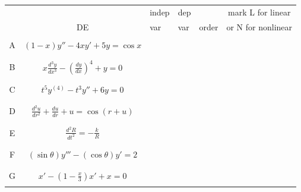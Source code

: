\documentclass[12pt]{article}
\newcommand{\<}{\langle}
\renewcommand{\>}{\rangle}
\def\ds{\displaystyle}
\begin{document}
		\begin{center}
		\begin{tabular}{|c|c|p{1.25cm}|p{1.25cm}|p{1.5cm}|c|}
		\hline
			&		& indep	& dep	&		& mark L for linear\\
			& DE		& var		& var		& order	& or N for nonlinear\\
		\hline \hline
			&		&		&		&		&\\
		A	& $\ds (1 - x)y'' - 4xy' + 5y = \cos x$
					&		&		&		&\\
			&		&		&		&		&\\
		\hline
			&		&		&		&		&\\
		B	& $\ds x \frac{d^3y}{dx^3} - \left( \frac{dy}{dx} \right)^4 + y = 0$
					&		&		&		&\\
			&		&		&		&		&\\
		\hline
			&		&		&		&		&\\
		C	& $\ds t^5 y^{(4)} - t^3 y'' + 6y = 0$
					&		&		&		&\\
			&		&		&		&		&\\
		\hline
			&		&		&		&		&\\
		D	& $\ds \frac{d^2u}{dr^2} + \frac{du}{dr} + u = \cos(r+u)$
					&		&		&		&\\
			&		&		&		&		&\\
		\hline
			&		&		&		&		&\\
		E	& $\ds \frac{d^2R}{dt^2} = -\frac{k}{R}$
					&		&		&		&\\
			&		&		&		&		&\\
		\hline
			&		&		&		&		&\\
		F	& $\ds (\sin \theta)y''' - (\cos \theta)y' = 2$
					&		&		&		&\\
			&		&		&		&		&\\
		\hline
			&		&		&		&		&\\
		G	& $\ds x' - \left( 1 - \frac{x}{3} \right)x' + x = 0$
					&		&		&		&\\
			&		&		&		&		&\\
		\hline
		\end{tabular}
		\end{center}

\end{document}
